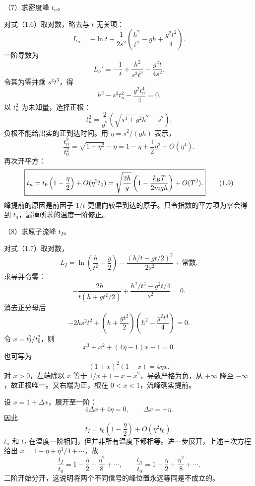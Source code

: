 \documentclass[12pt,a4paper,fontset=fandol]{ctexart}
\begin{document}
（7）求密度峰 \(t_n\)。

对式（1.6）取对数，略去与 \(t\) 无关项： \[
L_n=-\ln t-\frac{1}{2s^2}
\left(\frac{h^2}{t^2}-gh+\frac{g^2t^2}{4}\right).
\] 一阶导数为 \[
L_n'=-\frac1t+\frac{h^2}{s^2t^3}-\frac{g^2t}{4s^2}.
\] 令其为零并乘 \(s^2t^3\)，得 \[
h^2-s^2t_n^2-\frac{g^2t_n^4}{4}=0.
\] 以 \(t_n^2\) 为未知量，选择正根： \[
\boxed{t_n^2=\frac{2}{g^2}
\left(\sqrt{s^4+g^2h^2}-s^2\right).}\tag{1.8}
\] 负根不能给出实的正到达时间。用 \(\eta=s^2/(gh)\) 表示， \[
\frac{t_n^2}{t_0^2}=\sqrt{1+\eta^2}-\eta
=1-\eta+\frac12\eta^2+O(\eta^4).
\] 再次开平方： \[
\boxed{t_n=t_0\left(1-\frac{\eta}{2}\right)+O(\eta^2t_0)
=\sqrt{\frac{2h}{g}}
\left(1-\frac{k_{\rm B}T}{2mgh}\right)+O(T^2).}\tag{1.9}
\] 峰提前的原因是前因子 \(1/t\)
更偏向较早到达的原子。只令指数的平方项为零会得到
\(t_0\)，漏掉所求的温度一阶修正。

（8）求原子流峰 \(t_I\)。

对式（1.7）取对数， \[
L_I=\ln\!\left(\frac h{t^2}+\frac g2\right)
-\frac{(h/t-gt/2)^2}{2s^2}+\text{常数}.
\] 求导并令零： \[
-\frac{2h}{t(h+gt^2/2)}
+\frac{h^2/t^3-g^2t/4}{s^2}=0.
\] 消去正分母后 \[
-2hs^2t^2+
\left(h+\frac{gt^2}{2}\right)
\left(h^2-\frac{g^2t^4}{4}\right)=0.
\] 令 \(x=t_I^2/t_0^2\)，则 \[
x^3+x^2+(4\eta-1)x-1=0.
\] 也可写为 \[
(1+x)^2(1-x)=4\eta x.
\] 对 \(x>0\)，左端除以 \(x\) 等于 \(1/x+1-x-x^2\)，导数严格为负，从
\(+\infty\) 降至 \(-\infty\)，故正根唯一。又右端为正，根在
\(0<x<1\)，流峰确实提前。

设 \(x=1+\Delta x\)，展开至一阶： \[
4\Delta x+4\eta=0,\qquad \Delta x=-\eta.
\] 因此 \[
\boxed{t_I=t_0\left(1-\frac{\eta}{2}\right)+O(\eta^2t_0).}\tag{1.10}
\] \(t_n\) 和 \(t_I\)
在温度一阶相同，但并非所有温度下都相等。进一步展开，上述三次方程给出
\(x=1-\eta+\eta^3/4+\cdots\)，故 \[
\frac{t_I}{t_0}=1-\frac\eta2-\frac{\eta^2}{8}+\cdots,\qquad
\frac{t_n}{t_0}=1-\frac\eta2+\frac{\eta^2}{8}+\cdots.
\] 二阶开始分开，这说明将两个不同信号的峰位置永远等同是不成立的。

\begin{center}
\begin{minipage}{\linewidth}
\centering\begingroup
{}
\ifdim\wd\diagrambox>.88\linewidth
\sbox{\diagrambox}{\resizebox{.88\linewidth}{!}{\usebox{\diagrambox}}}
\fi
\ifdim\ht\diagrambox>.40\textheight
\resizebox{!}{.40\textheight}{\usebox{\diagrambox}}
\else\usebox{\diagrambox}\fi
\par{}
\endgroup\end{minipage}
\end{center}
\end{document}
